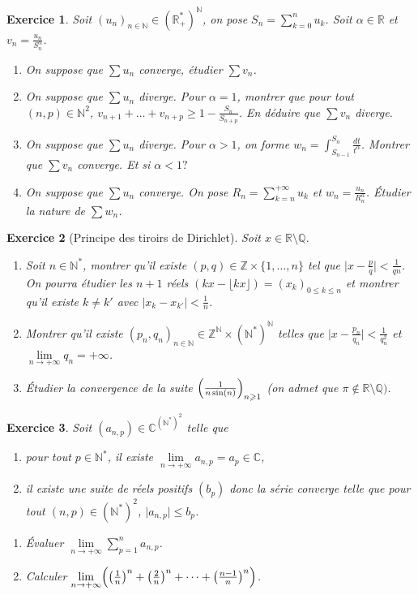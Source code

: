 \documentclass[12pt]{article}
\newtheorem{exercise}{Exercice}[section]
\theoremstyle{remark}
\theoremstyle{remark}
\newcommand{\R}{\mathbb{R}}
\newcommand{\C}{\mathbb{C}}
\newcommand{\Q}{\mathbb{Q}}
\newcommand{\N}{\mathbb{N}}
\newcommand{\Z}{\mathbb{Z}}
\begin{document}
\begin{exercise}
	Soit $(u_{n})_{n\in\N}\in(\R_{+}^{*})^{\N}$, on pose
	$S_{n}=\sum_{k=0}^{n}u_{k}$. Soit $\alpha\in\R$ et
	$v_{n}=\frac{u_{n}}{S_{n}^{\alpha}}$.
	\begin{enumerate}
		\item On suppose que $\sum u_{n}$ converge, étudier $\sum v_{n}$.
		\item On suppose que $\sum u_{n}$ diverge. Pour $\alpha=1$, montrer que
		pour tout $(n,p)\in\N^{2}$, $v_{n+1}+\dots+v_{n+p}\geqslant
		1-\frac{S_{n}}{S_{n+p}}$. En déduire que $\sum v_{n}$ diverge.
		\item On suppose que $\sum u_{n}$ diverge. Pour $\alpha>1$, on forme
		$w_{n}=\int_{S_{n-1}}^{S_{n}}\frac{dt}{t^{\alpha}}$. Montrer que $\sum
		v_{n}$ converge. Et si $\alpha<1 ?$
		\item On suppose que $\sum u_{n}$ converge. On pose
		$R_{n}=\sum_{k=n}^{+\infty}u_{k}$ et
		$w_{n}=\frac{u_{n}}{R_{n}^{\alpha}}$. Étudier la nature de $\sum w_{n}$.
	\end{enumerate}
\end{exercise}

\begin{exercise}[Principe des tiroirs de Dirichlet]
	Soit $x\in\R\setminus\Q$.
	\begin{enumerate}
		\item Soit $n\in\N^{*}$, montrer qu'il existe
		$(p,q)\in\Z\times\{1,\dots,n\}$ tel que $\bigl\vert
		x-\frac{p}{q}\bigr\vert<\frac{1}{qn}$. On pourra étudier les $n+1$ réels
		$(kx-\lfloor kx\rfloor)=(x_{k})_{0\leqslant k\leqslant n}$ et montrer
		qu'il existe $k\neq k'$ avec $\vert x_{k}-x_{k'}\vert<\frac{1}{n}$.
		\item Montrer qu'il existe
		$(p_{n},q_{n})_{n\in\N}\in\Z^{\N}\times(\N^{*})^{\N}$ telles que $\bigl\vert
		x-\frac{p_{n}}{q_{n}}\bigr\vert<\frac{1}{q_{n}^{2}}$ et
		$\lim\limits_{n\to+\infty}q_{n}=+\infty$.
		\item Étudier la convergence de la suite
		$\Bigl(\frac{1}{n\sin(n)}\Bigr)_{n\geqslant1}$ (on admet que $\pi\notin\R\setminus\Q)$.
	\end{enumerate}
\end{exercise}

\begin{exercise}
	Soit $(a_{n,p})\in\C^{(\N^{*})^{2}}$ telle que 
	\begin{enumerate}
		\item [(i)] pour tout $p\in\N^{*}$, il existe $\lim\limits_{n\to+\infty}a_{n,p}=a_{p}\in\C$,
		\item [(ii)] il existe une suite de réels positifs $(b_{p})$ donc la
		série converge telle que pour tout $(n,p)\in(\N^{*})^{2}$, $\lvert
		a_{n,p}\rvert\leqslant b_{p}$.	
	\end{enumerate}
	\begin{enumerate}
		\item Évaluer $\lim\limits_{n\to+\infty}\sum_{p=1}^{n}a_{n,p}$.
		\item Calculer $\lim\limits_{n\to+\infty}\Bigl(\bigl(\frac{1}{n}\bigr)^{n}+\bigl(\frac{2}{n}\bigr)^{n}+\dots+\bigl(\frac{n-1}{n}\bigr)^{n}\Bigr)$.
	\end{enumerate}
\end{exercise}
\end{document}
